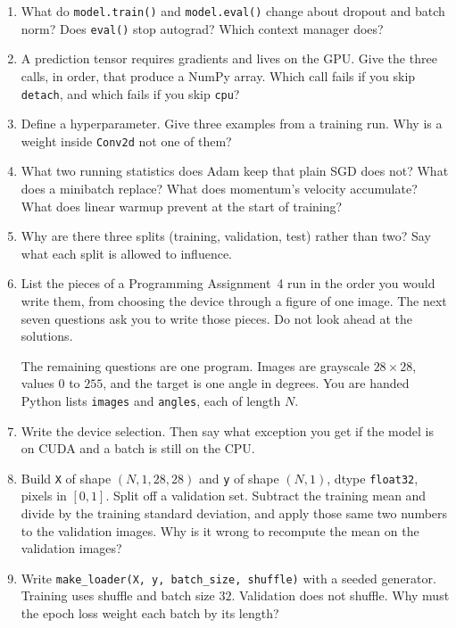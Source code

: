 \documentclass[11pt]{article}
\begin{document}
\begin{enumerate}
\item What do \texttt{model.train()} and \texttt{model.eval()} change about dropout and batch norm? Does \texttt{eval()} stop autograd? Which context manager does?

\item A prediction tensor requires gradients and lives on the GPU. Give the three calls, in order, that produce a NumPy array. Which call fails if you skip \texttt{detach}, and which fails if you skip \texttt{cpu}?

\item Define a hyperparameter. Give three examples from a training run. Why is a weight inside \texttt{Conv2d} not one of them?

\item What two running statistics does Adam keep that plain SGD does not? What does a minibatch replace? What does momentum's velocity accumulate? What does linear warmup prevent at the start of training?

\item Why are there three splits (training, validation, test) rather than two? Say what each split is allowed to influence.

\item List the pieces of a Programming Assignment~4 run in the order you would write them, from choosing the device through a figure of one image. The next seven questions ask you to write those pieces. Do not look ahead at the solutions.

The remaining questions are one program. Images are grayscale $28\times 28$, values $0$ to $255$, and the target is one angle in degrees. You are handed Python lists \texttt{images} and \texttt{angles}, each of length $N$.

\item Write the device selection. Then say what exception you get if the model is on CUDA and a batch is still on the CPU.

\item Build \texttt{X} of shape $(N,1,28,28)$ and \texttt{y} of shape $(N,1)$, dtype \texttt{float32}, pixels in $[0,1]$. Split off a validation set. Subtract the training mean and divide by the training standard deviation, and apply those same two numbers to the validation images. Why is it wrong to recompute the mean on the validation images?

\item Write \texttt{make\_loader(X, y, batch\_size, shuffle)} with a seeded generator. Training uses shuffle and batch size $32$. Validation does not shuffle. Why must the epoch loss weight each batch by its length?


\end{enumerate}
\end{document}
